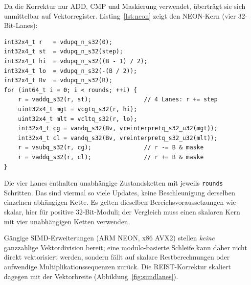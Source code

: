 \documentclass[11pt,a4paper]{scrartcl}
\theoremstyle{definition}
\theoremstyle{plain}
\theoremstyle{remark}
\begin{document}
Da die Korrektur nur ADD, CMP und Maskierung verwendet, überträgt sie sich unmittelbar auf Vektorregister. Listing~\ref{lst:neon} zeigt den NEON-Kern (vier 32-Bit-Lanes):

\noindent\begin{minipage}{\linewidth}
\begin{lstlisting}[caption={NEON-Variante des REIST-Zählers: lane-weise Addition und maskenbasierte $\pm B$-Korrektur auf vier Werten gleichzeitig (korrigierte schematische Referenzform).},label={lst:neon}]
int32x4_t r   = vdupq_n_s32(0);
int32x4_t st  = vdupq_n_s32(step);
int32x4_t hi  = vdupq_n_s32((B - 1) / 2);
int32x4_t lo  = vdupq_n_s32(-(B / 2));
int32x4_t Bv  = vdupq_n_s32(B);
for (int64_t i = 0; i < rounds; ++i) {
    r = vaddq_s32(r, st);               // 4 Lanes: r += step
    uint32x4_t mgt = vcgtq_s32(r, hi);
    uint32x4_t mlt = vcltq_s32(r, lo);
    int32x4_t cg = vandq_s32(Bv, vreinterpretq_s32_u32(mgt));
    int32x4_t cl = vandq_s32(Bv, vreinterpretq_s32_u32(mlt));
    r = vsubq_s32(r, cg);               // r -= B & maske
    r = vaddq_s32(r, cl);               // r += B & maske
}
\end{lstlisting}
\end{minipage}

Die vier Lanes enthalten unabhängige Zustandsketten mit jeweils \texttt{rounds} Schritten. Das sind viermal so viele Updates, keine Beschleunigung derselben einzelnen abhängigen Kette. Es gelten dieselben Bereichsvoraussetzungen wie skalar, hier für positive 32-Bit-Moduli; der Vergleich muss einen skalaren Kern mit vier unabhängigen Ketten verwenden.

Gängige SIMD-Erweiterungen (ARM NEON, x86 AVX2) stellen \emph{keine} ganzzahlige Vektordivision bereit; eine modulo-basierte Schleife kann daher nicht direkt vektorisiert werden, sondern fällt auf skalare Restberechnungen oder aufwendige Multiplikationssequenzen zurück. Die REIST-Korrektur skaliert dagegen mit der Vektorbreite (Abbildung~\ref{fig:simdlanes}).
\end{document}
